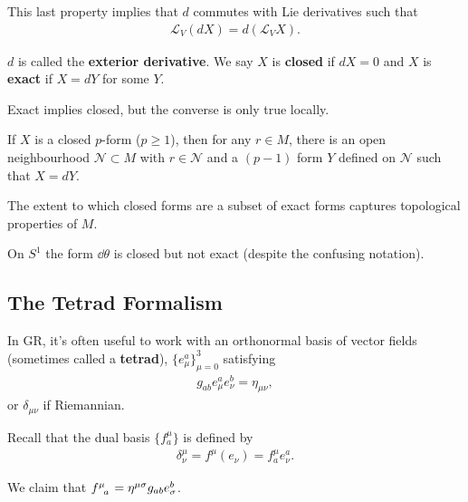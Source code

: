 This last property implies that $d$ commutes with Lie derivatives such that
\begin{align}
    \mathcal{L}_V \left( d X \right) = d \left( \mathcal{L}_V X \right)
.\end{align}

\begin{definition}
    $d$ is called the \textbf{exterior derivative}. We say $X$ is \textbf{closed} if $d X = 0$ and $X$ is \textbf{exact} if $X = dY$ for some $Y$.
\end{definition}

Exact implies closed, but the converse is only true locally.

\begin{lemma}
    If $X$ is a closed $p$-form ($p \geq 1$), then for any $r \in M$, there is an open neighbourhood $\mathcal{N} \subset M$ with $r \in \mathcal{N}$ and a $\left( p - 1 \right)$ form $Y$ defined on $\mathcal{N}$ such that $X = d Y$.
\end{lemma}

The extent to which closed forms are a subset of exact forms captures topological properties of $M$.

\begin{example}
    On $S^{1}$ the form $\dd{\theta}$ is closed but not exact (despite the confusing notation).
\end{example}

\subsection{The Tetrad Formalism}

In GR, it's often useful to work with an orthonormal basis of vector fields (sometimes called a \textbf{tetrad}), $\{e^{a}_{\mu}\}_{\mu = 0}^{3}$ satisfying
\begin{align}
    g_{ab} e^{a}_{\mu} e^{b}_{\nu} = \eta_{\mu \nu}
,\end{align}
or $\delta_{\mu \nu}$ if Riemannian.

Recall that the dual basis $\{f_{a}^{\mu}\}$ is defined by
\begin{align}
    \delta^{\mu}_\nu = f^{\mu} \left( e_\nu \right) = f^{\mu}_a e^{a}_\nu
.\end{align}

\begin{claim}
    We claim that $\tensor{f}{^{\mu}_a} = \eta^{\mu \sigma} g_{ab} e^{b}_{\sigma}$.
\end{claim}

